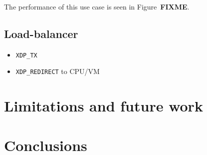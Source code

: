 \documentclass[10pt,sigconf]{acmart}
\begin{document}
The performance of this use case is seen in Figure~\textbf{FIXME}.

\subsection{Load-balancer}
\label{sec:org685e28c}
\begin{itemize}
\item \texttt{XDP\_TX}
\item \texttt{XDP\_REDIRECT} to CPU/VM
\end{itemize}

\section{Limitations and future work}
\label{sec:limitations}


\section{Conclusions}
\label{sec:conclusion}







\end{document}
